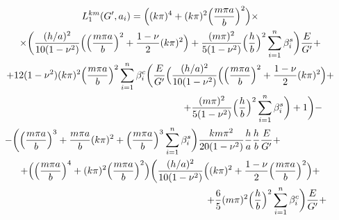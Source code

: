 \begin{multline}

\label{eq:myl:f14}

L_1^{km}(G',a_i)=

\Bigl((k\pi)^4+(k\pi)^2\Bigl(\frac{m\pi a}{b}\Bigr)^2\Bigr) \times 

\\ \times

\biggl(\frac{({h}/{a})^2}{10(1-\nu^2)} 

\Bigl(\Bigl(\frac{m\pi a}{b}\Bigr)^2+\frac{1-\nu}{2}(k\pi)^2\Bigr)+\frac{(m \pi)^2}{5(1-\nu^2)}

\Bigl(\frac{h}{b}\Bigr)^2\sum_{i=1}^n \beta_i^s\biggr)

\frac{E}{G'}+\\

+12(1-\nu^2)(k\pi)^2\Bigl(\frac{m\pi a}{b}\Bigr)^2\sum_{i=1}^n\beta_i^c

\biggl(\frac{E}{G'}

\Bigl(\frac{({h}/{a})^2}{10(1-\nu^2)} 

\Bigl(\Bigl(\frac{m\pi a}{b}\Bigr)^2+

\frac{1-\nu}{2}(k\pi)^2\Bigr)+ 

\\

\hspace{6cm}

+

\frac{(m\pi)^2}{5(1-\nu^2)}

\Bigl(\frac{h}{b}\Bigr)^2 \sum_{i=1}^n\beta_i^s\biggr)+1\biggr)-\\

-\biggl(

\Bigl(\frac{m\pi a}{b}\Bigr)^3+\frac{m\pi a}{b}(k\pi)^2+

\Bigl(\frac{m\pi a}{b}\Bigr)^3\sum_{i=1}^n\beta_i^s\biggr)

\frac{km\pi^2}{20(1-\nu^2)}\frac{h}{a}\frac{h}{b}\frac{E}{G'}+ \hspace{2cm} \\

+\Bigl(\Bigl(\frac{m\pi a}{b}\Bigr)^4+(k\pi)^2

\Bigl(\frac{m\pi a}{b}\Bigr)^2\Bigr)

\biggl(\frac{({h}/{a})^2}{10(1-\nu^2)} 

\Bigl((k\pi)^2+\frac{1-\nu}{2}\Bigl(\frac{m\pi a}{b}\Bigr)^2\Bigr)+

\\

\hspace{7cm}   +\frac{6}{5}(m\pi)^2\Bigl(\frac{h}{b}\Bigr)^2   \sum_{i=1}^n \beta_i^c\biggr)\frac{E}{G'}+ \\


\end{multline}
